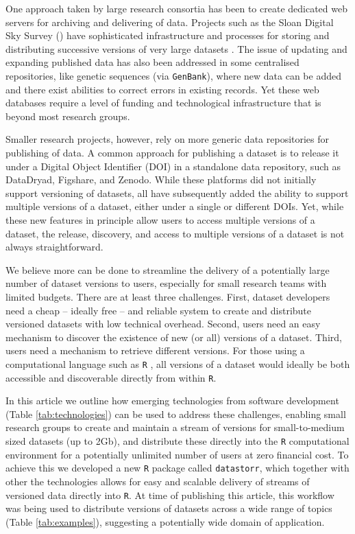 \documentclass[a4paper,num-refs]{assets/oup-contemporary}
\begin{document}
One approach taken by large research consortia has been to create dedicated web servers for archiving and delivering of data. Projects such as the Sloan Digital Sky Survey () have sophisticated infrastructure and processes for storing and distributing successive versions of very large datasets \cite{Abolfathi-2018}. The issue of updating and expanding published data has also been addressed in some centralised repositories, like genetic sequences (via \texttt{GenBank}), where new data can be added and there exist abilities to correct errors in existing records. Yet these web databases require a level of funding and technological infrastructure that is beyond most research groups.

Smaller research projects, however, rely on more generic data repositories for publishing of data. A common approach for publishing a dataset is to release it under a Digital Object Identifier (DOI) in a standalone data repository, such as DataDryad, Figshare, and Zenodo. While these platforms did not initially support versioning of datasets, all have subsequently added the ability to support multiple versions of a dataset, either under a single or different DOIs. Yet, while these new features in principle allow users to access multiple versions of a dataset, the release, discovery, and access to multiple versions of a dataset is not always straightforward.

We believe more can be done to streamline the delivery of a potentially large number of dataset versions to users, especially for small research teams with limited budgets. There are at least three challenges. First, dataset developers need a cheap -- ideally free -- and reliable system  to create and distribute versioned datasets with low technical overhead. Second, users need an easy mechanism to discover the existence of new (or all) versions of a dataset. Third, users need a mechanism to retrieve different versions. For those using a computational language such as \texttt{R} \cite{R-2017}, all versions of a dataset would ideally be both accessible and discoverable directly from within \texttt{R}.

In this article we outline how emerging technologies from software development  (Table \ref{tab:technologies}) can be used to address these challenges, enabling small research groups to create and maintain a stream of versions for small-to-medium sized datasets (up to 2Gb), and distribute these directly into the \texttt{R} computational environment for a potentially unlimited number of users at zero financial cost. To achieve this we developed a new \texttt{R} package called \texttt{datastorr}, which together with other the technologies allows for easy and scalable delivery of streams of versioned data directly into \texttt{R}. At time of publishing this article, this workflow was being used to distribute versions of datasets across a wide range of topics (Table \ref{tab:examples}), suggesting a potentially wide domain of application.
\end{document}
